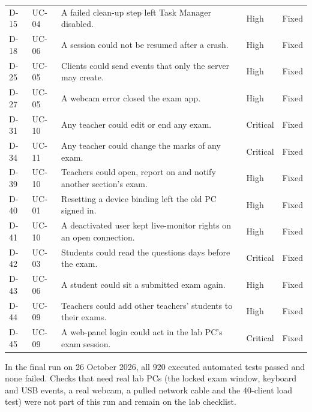 {\begin{longtable}{@{}P{1.5cm}P{1.8cm}P{8.3cm}P{1.7cm}>{\centering\arraybackslash}p{1.3cm}@{}}
D-15 & UC-04 & A failed clean-up step left Task Manager disabled. & High & Fixed\\
D-18 & UC-06 & A session could not be resumed after a crash. & High & Fixed\\
D-25 & UC-05 & Clients could send events that only the server may create. & High & Fixed\\
D-27 & UC-05 & A webcam error closed the exam app. & High & Fixed\\
D-31 & UC-10 & Any teacher could edit or end any exam. & Critical & Fixed\\
D-34 & UC-11 & Any teacher could change the marks of any exam. & Critical & Fixed\\
D-39 & UC-10 & Teachers could open, report on and notify another section's exam. & High & Fixed\\
D-40 & UC-01 & Resetting a device binding left the old PC signed in. & High & Fixed\\
D-41 & UC-10 & A deactivated user kept live-monitor rights on an open connection. & High & Fixed\\
D-42 & UC-03 & Students could read the questions days before the exam. & Critical & Fixed\\
D-43 & UC-06 & A student could sit a submitted exam again. & High & Fixed\\
D-44 & UC-09 & Teachers could add other teachers' students to their exams. & High & Fixed\\
D-45 & UC-09 & A web-panel login could act in the lab PC's exam session. & Critical & Fixed\\
\end{longtable}}

In the final run on 26 October 2026, all 920 executed automated tests passed and none failed. Checks that need real lab PCs (the locked exam window, keyboard and USB events, a real webcam, a pulled network cable and the 40-client load test) were not part of this run and remain on the lab checklist.
